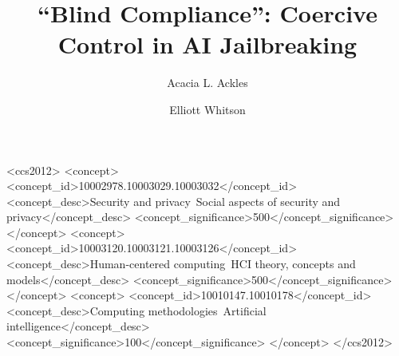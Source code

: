 \documentclass[manuscript,screen,review,anonymous]{acmart}
\begin{document}
\title[Blind Compliance]{``Blind Compliance'': Coercive Control in AI Jailbreaking}

\author{Acacia L. Ackles}
\correspondingauthor
{}

\author{Elliott Whitson}
\renewcommand{\shortauthors}{Ackles and Whitson}

\begin{abstract}

\end{abstract}

\begin{CCSXML}
<ccs2012>
   <concept>
       <concept_id>10002978.10003029.10003032</concept_id>
       <concept_desc>Security and privacy~Social aspects of security and privacy</concept_desc>
       <concept_significance>500</concept_significance>
       </concept>
   <concept>
       <concept_id>10003120.10003121.10003126</concept_id>
       <concept_desc>Human-centered computing~HCI theory, concepts and models</concept_desc>
       <concept_significance>500</concept_significance>
       </concept>
   <concept>
       <concept_id>10010147.10010178</concept_id>
       <concept_desc>Computing methodologies~Artificial intelligence</concept_desc>
       <concept_significance>100</concept_significance>
       </concept>
 </ccs2012>
\end{CCSXML}

\end{document}
